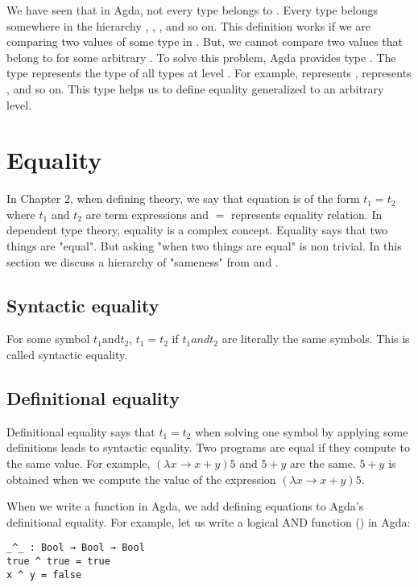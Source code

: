 We have seen that in Agda, not every type belongs to . Every
type belongs somewhere in the hierarchy , ,
, and so on. This definition works if we are comparing two values
of some type in . But, we cannot compare two values that belong to
 for some arbitrary . To solve this problem, Agda
provides type . The type  represents the type of all
types at level . For example,  represents ,
 represents , and so on. This type helps us to define
equality generalized to an arbitrary level.

\section{Equality}
\label{equality}
In Chapter 2, when defining theory, we say that equation is of the form $t_1 =
t_2$ where $t_1$ and $t_2$ are term expressions and $=$ represents equality
relation. In dependent type theory, equality is a complex concept. Equality says
that two things are "equal". But asking "when two things are equal" is non
trivial. In this section we discuss a hierarchy of "sameness" from
\cite{bocquet2020coherence} and \cite{eremondi2022propositional}.

\subsection{Syntactic equality}
For some symbol $t_1 \text{and} t_2$, $t_1 = t_2$ if $t_1 and t_2$ are literally
the same symbols. This is called syntactic equality.

\subsection{Definitional equality}
Definitional equality says that $t_1 = t_2$ when solving one symbol by applying
some definitions leads to syntactic equality. Two programs are equal if they
compute to the same value. For example, $(\lambda x \rightarrow x + y) 5$ and $5
+ y$ are the same. $5 + y$ is obtained when we compute the value of the
expression $ (\lambda x \rightarrow x + y) 5$.

When we write a function in Agda, we add defining equations to Agda's
definitional equality. For example, let us write a logical AND function
(\inline{_^_}) in Agda:

\begin{verbatim}
_^_ : Bool → Bool → Bool
true ^ true = true
x ^ y = false
\end{verbatim}

